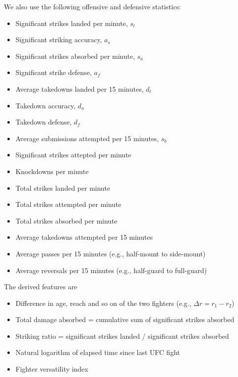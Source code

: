 \noindent
We also use the following offensive and defensive statistics:

\begin{itemize}[noitemsep]
  \item Significant strikes landed per minute, $s_l$
  \item Significant striking accuracy, $a_s$
  \item Significant strikes absorbed per minute, $s_a$
  \item Significant strike defense, $a_f$
  \item Average takedowns landed per 15 minutes, $d_t$
  \item Takedown accuracy, $d_a$
  \item Takedown defense, $d_f$
  \item Average submissions attempted per 15 minutes, $s_b$
\end{itemize}

\begin{itemize}[noitemsep]
  \item Significant strikes attepted per minute
  \item Knockdowns per minute
  \item Total strikes landed per minute
  \item Total strikes attempted per minute
  \item Total strikes absorbed per minute
  \item Average takedowns attempted per 15 minutes
  \item Average passes per 15 minutes (e.g., half-mount to side-mount)
  \item Average reversals per 15 minutes (e.g., half-guard to full-guard)
\end{itemize}

\noindent
The derived features are

\begin{itemize}[noitemsep]
  \item Difference in age, reach and so on of the two fighters (e.g., $\Delta r=r_1-r_2$)
  \item Total damage absorbed = cumulative sum of significant strikes absorbed
  \item Striking ratio = significant strikes landed / significant strikes absorbed
  \item Natural logarithm of elapsed time since last UFC fight
  \item Fighter versatility index
\end{itemize}

